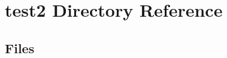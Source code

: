 \section{test2 Directory Reference}
\label{dir_165d86860ac47e817d278522cdfae0c4}
\subsection*{Files}
\begin{DoxyCompactItemize}
\end{DoxyCompactItemize}
